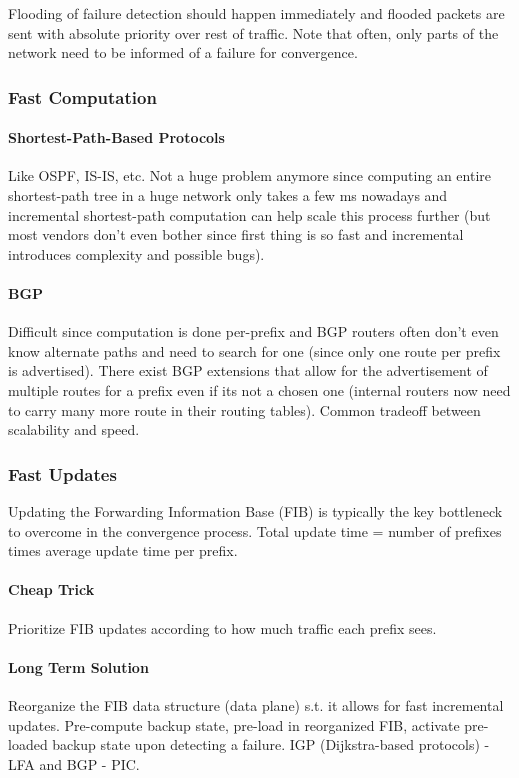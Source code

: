 Flooding of failure detection should happen immediately and flooded packets are sent with absolute priority over rest of traffic. Note that often, only parts of the network need to be informed of a failure for convergence.


\subsubsection{Fast Computation}

\paragraph{Shortest-Path-Based Protocols}
Like OSPF, IS-IS, etc. Not a huge problem anymore since computing an entire shortest-path tree in a huge network only takes a few ms nowadays and incremental shortest-path computation can help scale this process further (but most vendors don't even bother since first thing is so fast and incremental introduces complexity and possible bugs).

\paragraph{BGP}
Difficult since computation is done per-prefix and BGP routers often don't even know alternate paths and need to search for one (since only one route per prefix is advertised). There exist BGP extensions that allow for the advertisement of multiple routes for a prefix even if its not a chosen one (internal routers now need to carry many more route in their routing tables). Common tradeoff between scalability and speed.




\subsubsection{Fast Updates}

Updating the Forwarding Information Base (FIB) is typically the key bottleneck to overcome in the convergence process. Total update time = number of prefixes times average update time per prefix.

\paragraph{Cheap Trick}
Prioritize FIB updates according to how much traffic each prefix sees.

\paragraph{Long Term Solution}
Reorganize the FIB data structure (data plane) s.t. it allows for fast incremental updates. Pre-compute backup state, pre-load in reorganized FIB, activate pre-loaded backup state upon detecting a failure. IGP (Dijkstra-based protocols) - LFA and BGP - PIC.

